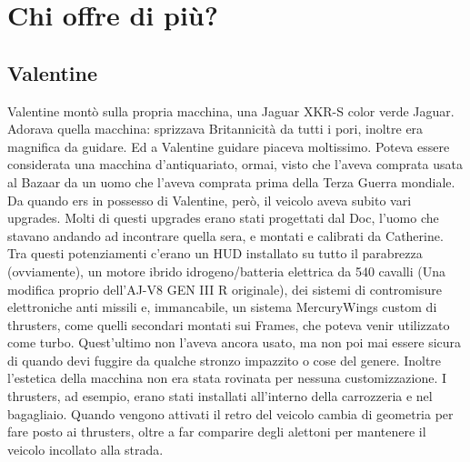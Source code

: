 \chapter{Chi offre di più?}

  \section*{Valentine}

    Valentine montò sulla propria macchina, una Jaguar XKR-S color verde Jaguar. Adorava quella macchina: sprizzava
    Britannicità da tutti i pori, inoltre era magnifica da guidare. Ed a Valentine guidare piaceva moltissimo. Poteva
    essere considerata una macchina d'antiquariato, ormai, visto che l'aveva
    comprata usata al Bazaar da un uomo che l'aveva comprata prima della Terza Guerra mondiale. Da quando ers in
    possesso di Valentine, però, il veicolo aveva subito vari upgrades. Molti di questi upgrades erano stati progettati
    dal Doc, l'uomo che stavano andando ad incontrare quella sera, e montati e calibrati da Catherine. Tra questi
    potenziamenti c'erano un HUD installato su tutto il parabrezza (ovviamente), un motore ibrido idrogeno/batteria
    elettrica da 540 cavalli (Una modifica proprio dell'AJ-V8 GEN III R originale), dei sistemi di contromisure elettroniche anti missili e, immancabile, un sistema
    MercuryWings custom di thrusters, come quelli secondari montati sui Frames, che poteva venir utilizzato come turbo.
    Quest'ultimo non l'aveva ancora usato, ma non poi mai essere sicura di quando devi fuggire da qualche stronzo
    impazzito o cose del genere. Inoltre l'estetica della macchina non era stata rovinata per nessuna customizzazione. I
    thrusters, ad esempio, erano stati installati all'interno della carrozzeria e nel bagagliaio. Quando vengono
    attivati il retro del veicolo cambia di geometria per fare posto ai thrusters, oltre a far comparire degli alettoni
    per mantenere il veicolo incollato alla strada.

